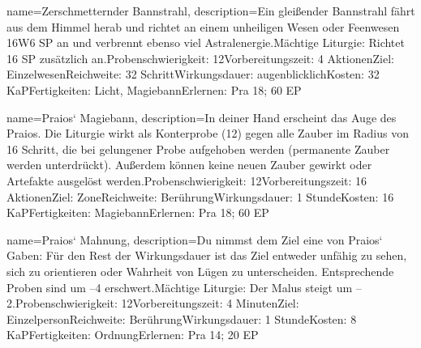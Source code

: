 {
    name={Zerschmetternder Bannstrahl},
    description={Ein gleißender Bannstrahl fährt aus dem Himmel herab und richtet an einem unheiligen Wesen oder Feenwesen 16W6 SP an und verbrennt ebenso viel Astralenergie.\newline Mächtige Liturgie: Richtet 16 SP zusätzlich an.\newline Probenschwierigkeit: 12\newline Vorbereitungszeit: 4 Aktionen\newline Ziel: Einzelwesen\newline Reichweite: 32 Schritt\newline Wirkungsdauer: augenblicklich\newline Kosten: 32 KaP\newline Fertigkeiten: Licht, Magiebann\newline Erlernen: Pra 18; 60 EP}
}


{
    name={Praios‘ Magiebann},
    description={In deiner Hand erscheint das Auge des Praios. Die Liturgie wirkt als Konterprobe (12) gegen alle Zauber im Radius von 16 Schritt, die bei gelungener Probe aufgehoben werden (permanente Zauber werden unterdrückt). Außerdem können keine neuen Zauber gewirkt oder Artefakte ausgelöst werden.\newline Probenschwierigkeit: 12\newline Vorbereitungszeit: 16 Aktionen\newline Ziel: Zone\newline Reichweite: Berührung\newline Wirkungsdauer: 1 Stunde\newline Kosten: 16 KaP\newline Fertigkeiten: Magiebann\newline Erlernen: Pra 18; 60 EP}
}


{
    name={Praios‘ Mahnung},
    description={Du nimmst dem Ziel eine von Praios‘ Gaben: Für den Rest der Wirkungsdauer ist das Ziel entweder unfähig zu sehen, sich zu orientieren oder Wahrheit von Lügen zu unterscheiden. Entsprechende Proben sind um –4 erschwert.\newline Mächtige Liturgie: Der Malus steigt um –2.\newline Probenschwierigkeit: 12\newline Vorbereitungszeit: 4 Minuten\newline Ziel: Einzelperson\newline Reichweite: Berührung\newline Wirkungsdauer: 1 Stunde\newline Kosten: 8 KaP\newline Fertigkeiten: Ordnung\newline Erlernen: Pra 14; 20 EP}
}


